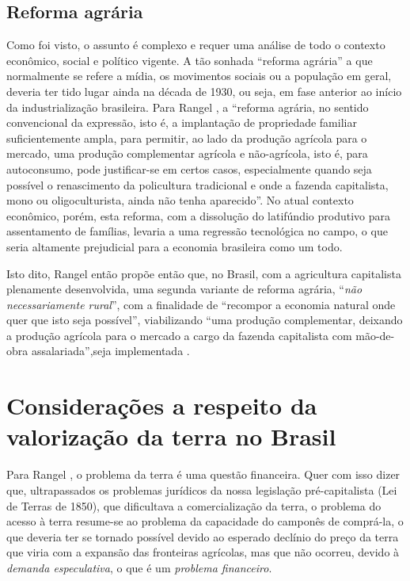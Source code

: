 \documentclass[
	12pt,				%
	oneside,			%
	a4paper,			%
	chapter=TITLE,		%
	section=TITLE,		%
	english,			%
	brazil				%
	]{abntex2}
\begin{document}
\hypertarget{reforma-agruxe1ria}{%
\subsection{Reforma agrária}\label{reforma-agruxe1ria}}

Como foi visto, o assunto é complexo e requer uma análise de todo o contexto
econômico, social e político vigente. A tão sonhada ``reforma agrária'' a que
normalmente se refere a mídia, os movimentos sociais ou a população em geral,
deveria ter tido lugar ainda na década de 1930, ou seja, em fase anterior ao
início da industrialização brasileira. Para Rangel \autocite[154]{rangel1986a}, a
``reforma agrária, no sentido convencional da expressão, isto é, a implantação de
propriedade familiar suficientemente ampla, para permitir, ao lado da produção
agrícola para o mercado, uma produção complementar agrícola e não-agrícola, isto
é, para autoconsumo, pode justificar-se em certos casos, especialmente quando
seja possível o renascimento da policultura tradicional e onde a fazenda
capitalista, mono ou oligoculturista, ainda não tenha aparecido''. No atual
contexto econômico, porém, esta reforma, com a dissolução do latifúndio
produtivo para assentamento de famílias, levaria a uma regressão tecnológica no
campo, o que seria altamente prejudicial para a economia brasileira como um
todo.

Isto dito, Rangel então propõe então que, no Brasil, com a agricultura
capitalista plenamente desenvolvida, uma segunda variante de reforma agrária,
``\emph{não necessariamente rural}'', com a finalidade de ``recompor a economia natural
onde quer que isto seja possível'', viabilizando ``uma produção complementar,
deixando a produção agrícola para o mercado a cargo da fazenda capitalista com
mão-de-obra assalariada'',seja implementada \autocite[155]{rangel1986a}.

\hypertarget{considerauxe7uxf5es-a-respeito-da-valorizauxe7uxe3o-da-terra-no-brasil}{%
\section{Considerações a respeito da valorização da terra no Brasil}\label{considerauxe7uxf5es-a-respeito-da-valorizauxe7uxe3o-da-terra-no-brasil}}

Para Rangel \autocite*[138-139]{rangel1986b}, o problema da terra é uma questão
financeira. Quer com isso dizer que, ultrapassados os problemas jurídicos da
nossa legislação pré-capitalista (Lei de Terras de 1850), que dificultava a
comercialização da terra, o problema do acesso à terra resume-se ao problema da
capacidade do camponês de comprá-la, o que deveria ter se tornado possível
devido ao esperado declínio do preço da terra que viria com a expansão das
fronteiras agrícolas, mas que não ocorreu, devido à \emph{demanda especulativa}, o
que é um \emph{problema financeiro}.
\end{document}
